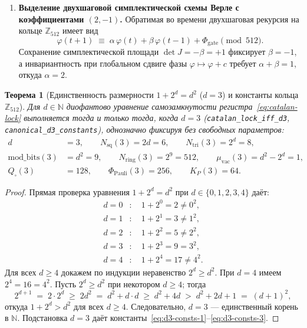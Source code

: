 \documentclass[11pt,a4paper]{article}
\theoremstyle{plain}
\newtheorem{theorem}{Теорема}[section]
\theoremstyle{definition}
\begin{document}
\begin{enumerate}[label=\textbf{Шаг \arabic*.},leftmargin=*]
\item \textbf{Выделение двухшаговой симплектической схемы Верле с коэффициентами $(2,-1)$.}
  Обратимая во времени двухшаговая рекурсия на кольце $\mathbb{Z}_{512}$ имеет вид
  \begin{equation}
    \label{eq:general-two-step}
    \varphi(t+1) \;\equiv\; \alpha\,\varphi(t) + \beta\,\varphi(t-1) + \Phi_{\mathrm{gate}} \pmod{512}.
  \end{equation}
  Сохранение симплектической площади $\det J = -\beta = +1$ фиксирует $\beta = -1$, а инвариантность при глобальном сдвиге фазы $\varphi \mapsto \varphi + c$ требует $\alpha + \beta = 1$, откуда $\alpha = 2$.
\end{enumerate}

\begin{theorem}[Единственность размерности $1 + 2^d = d^2$ ($d=3$) и константы кольца $\mathbb{Z}_{512}$]
\label{thm:d3-uniqueness}
Для $d\in\mathbb{N}$ диофантово уравнение самозамкнутости регистра~\eqref{eq:catalan-lock} выполняется тогда и только тогда, когда $d = 3$ (\texttt{catalan\_lock\_iff\_d3}, \texttt{canonical\_d3\_constants}), однозначно фиксируя без свободных параметров:
\begin{align}
  d &= 3, \qquad N_{\mathrm{sq}}(3) = 2d = 6, \qquad N_{\mathrm{tri}}(3) = 2^d = 8, \label{eq:d3-consts-1} \\
  \mathrm{mod\_bits}(3) &= d^2 = 9, \qquad N_{\mathrm{ring}}(3) = 2^9 = 512, \qquad \mu_{\mathrm{vac}}(3) = d^2 - 2^d = 1, \label{eq:d3-consts-2} \\
  Q_\square(3) &= 128, \qquad \Phi_{\mathrm{Pauli}}(3) = 256, \qquad K_P(3) = 64. \label{eq:d3-consts-3}
\end{align}
\end{theorem}

\begin{proof}
Прямая проверка уравнения $1 + 2^d = d^2$ при $d \in \{0, 1, 2, 3, 4\}$ даёт:
\begin{align*}
  d = 0 &: \quad 1 + 2^0 = 2 \ne 0^2, \\
  d = 1 &: \quad 1 + 2^1 = 3 \ne 1^2, \\
  d = 2 &: \quad 1 + 2^2 = 5 \ne 2^2, \\
  d = 3 &: \quad 1 + 2^3 = 9 = 3^2, \\
  d = 4 &: \quad 1 + 2^4 = 17 \ne 4^2.
\end{align*}
Для всех $d \ge 4$ докажем по индукции неравенство $2^d \ge d^2$. При $d = 4$ имеем $2^4 = 16 = 4^2$. Пусть $2^d \ge d^2$ при некотором $d \ge 4$; тогда
\begin{equation*}
  2^{d+1} \;=\; 2\cdot 2^d \;\ge\; 2d^2 \;=\; d^2 + d\cdot d \;\ge\; d^2 + 4d \;>\; d^2 + 2d + 1 \;=\; (d + 1)^2,
\end{equation*}
откуда $1 + 2^d > d^2$ для всех $d \ge 4$. Следовательно, $d = 3$ --- единственный корень в $\mathbb{N}$. Подстановка $d = 3$ даёт константы~\eqref{eq:d3-consts-1}--\eqref{eq:d3-consts-3}.
\end{proof}
\end{document}
